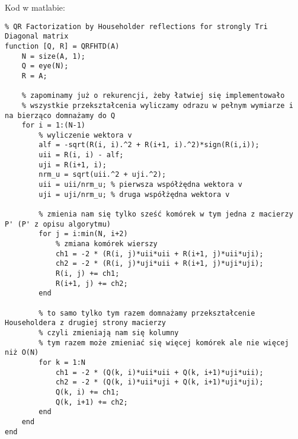 \documentclass{article}
\begin{document}
\newpage

Kod w matlabie:

\begin{verbatim}
% QR Factorization by Householder reflections for strongly Tri Diagonal matrix
function [Q, R] = QRFHTD(A)
    N = size(A, 1);
    Q = eye(N);
    R = A;

    % zapominamy już o rekurencji, żeby łatwiej się implementowało
    % wszystkie przekształcenia wyliczamy odrazu w pełnym wymiarze i na bierząco domnażamy do Q
    for i = 1:(N-1)
        % wyliczenie wektora v
        alf = -sqrt(R(i, i).^2 + R(i+1, i).^2)*sign(R(i,i));
        uii = R(i, i) - alf;
        uji = R(i+1, i);
        nrm_u = sqrt(uii.^2 + uji.^2);
        uii = uii/nrm_u; % pierwsza współżędna wektora v
        uji = uji/nrm_u; % druga współżędna wektora v

        % zmienia nam się tylko sześć komórek w tym jedna z macierzy P' (P' z opisu algorytmu)
        for j = i:min(N, i+2)
            % zmiana komórek wierszy
            ch1 = -2 * (R(i, j)*uii*uii + R(i+1, j)*uii*uji);
            ch2 = -2 * (R(i, j)*uji*uii + R(i+1, j)*uji*uji);
            R(i, j) += ch1;
            R(i+1, j) += ch2;
        end

        % to samo tylko tym razem domnażamy przekształcenie Householdera z drugiej strony macierzy
        % czyli zmieniają nam się kolumny
        % tym razem może zmieniać się więcej komórek ale nie więcej niż O(N)
        for k = 1:N
            ch1 = -2 * (Q(k, i)*uii*uii + Q(k, i+1)*uji*uii);
            ch2 = -2 * (Q(k, i)*uii*uji + Q(k, i+1)*uji*uji);
            Q(k, i) += ch1;
            Q(k, i+1) += ch2;
        end
    end
end
\end{verbatim}
\end{document}
